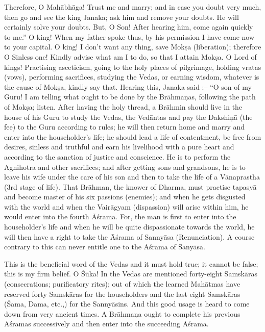 Therefore, O Mah\=abh\=aga! Trust me and marry; and in case you doubt very much, then go and see the king Janaka; ask him and remove your doubts. He will certainly solve your doubts. But, O Son! After hearing him, come again quickly to me.'' O king! When my father spoke thus, by his permission I have come now to your capital. O king! I don't want any thing, save Mok\d{s}a (liberation); therefore O Sinless one! Kindly advise what am I to do, so that I attain Mok\d{s}a. O Lord of kings! Practising asceticism, going to the holy places of pilgrimage, holding vratas (vows), performing sacrifices, studying the Vedas, or earning wisdom, whatever is the cause of Mok\d{s}a, kindly say that. Hearing this, Janaka said :-- ``O son of my Guru! I am telling what ought to be done by the Br\=ahma\d{n}as, following the path of Mok\d{s}a; listen. After having the holy thread, a Br\=ahmin should live in the house of his Guru to study the Vedas, the Ved\=antas and pay the Dakshi\d{n}\=a (the fee) to the Guru according to rules; he will then return home and marry and enter into the householder's life; he should lead a life of contentment, be free from desires, sinless and truthful and earn his livelihood with a pure heart and according to the sanction of justice and conscience. He is to perform the Agnihotra and other sacrifices; and after getting sons and grandsons, he is to leave his wife under the care of his son and then to take the life of a V\=anaprastha (3rd stage of life). That Br\=ahman, the knower of Dharma, must practise tapasy\=a and become master of his six passions (enemies); and when he gets disgusted with the world and when the Vair\=agyam (dispassion) will arise within him, he would enter into the fourth \=A\'srama. For, the man is first to enter into the householder's life and when he will be quite dispassionate towards the world, he will then have a right to take the \=A\'srama of Sanny\=asa (Renunciation). A course contrary to this can never entitle one to the \=A\'srama of Sany\=asa.

This is the beneficial word of the Vedas and it must hold true; it cannot be false; this is my firm belief. O \'S\=uka! In the Vedas are mentioned forty-eight Samsk\=aras (consecrations; purificatory rites); out of which the learned Mah\=atmas have reserved forty Samsk\=aras for the householders and the last eight Samsk\=aras (\'Sama, Dama, etc.,) for the Sanny\=asins. And this good usage is heard to come down from very ancient times. A Br\=ahma\d{n}a ought to complete his previous \=A\'sramas successively and then enter into the succeeding \=A\'srama.

